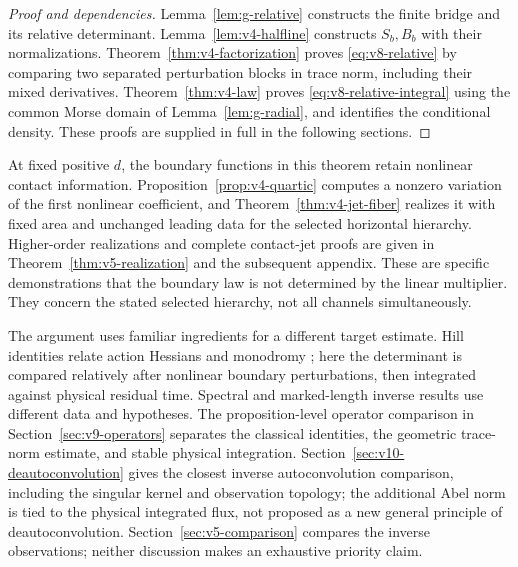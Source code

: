 \begin{proof}[Proof and dependencies]
Lemma~\ref{lem:g-relative} constructs the finite bridge and its relative
determinant. Lemma~\ref{lem:v4-halfline} constructs $S_b,B_b$ with their
normalizations. Theorem~\ref{thm:v4-factorization} proves
\eqref{eq:v8-relative} by comparing two separated perturbation blocks in
trace norm, including their mixed derivatives. Theorem~\ref{thm:v4-law}
proves \eqref{eq:v8-relative-integral} using the common Morse domain of
Lemma~\ref{lem:g-radial}, and identifies the conditional density.
These proofs are supplied in full in the following sections.
\end{proof}

At fixed positive $d$, the boundary functions in this theorem retain
nonlinear contact information. Proposition~\ref{prop:v4-quartic} computes
a nonzero variation of the first nonlinear coefficient, and
Theorem~\ref{thm:v4-jet-fiber} realizes it with fixed area and unchanged
leading data for the selected horizontal hierarchy. Higher-order
realizations and complete contact-jet proofs are given in
Theorem~\ref{thm:v5-realization} and the subsequent appendix. These are
specific demonstrations that the boundary law is not determined by the
linear multiplier. They concern the stated selected hierarchy, not all
channels simultaneously.

The argument uses familiar ingredients for a different target estimate.
Hill identities relate action Hessians and monodromy \cite{Hill}; here
the determinant is compared relatively after nonlinear boundary
perturbations, then integrated against physical residual time. Spectral
and marked-length inverse results \cite{Zelditch,DSKL,FinamoreLeguil}
use different data and hypotheses. The proposition-level operator comparison in
Section~\ref{sec:v9-operators} separates the classical identities,
the geometric trace-norm estimate, and stable physical integration.
Section~\ref{sec:v10-deautoconvolution} gives the closest inverse
autoconvolution comparison, including the singular kernel and observation
topology; the additional Abel norm is tied to the physical integrated
flux, not proposed as a new general principle of deautoconvolution.
Section~\ref{sec:v5-comparison} compares the inverse observations;
neither discussion makes an exhaustive priority claim.

